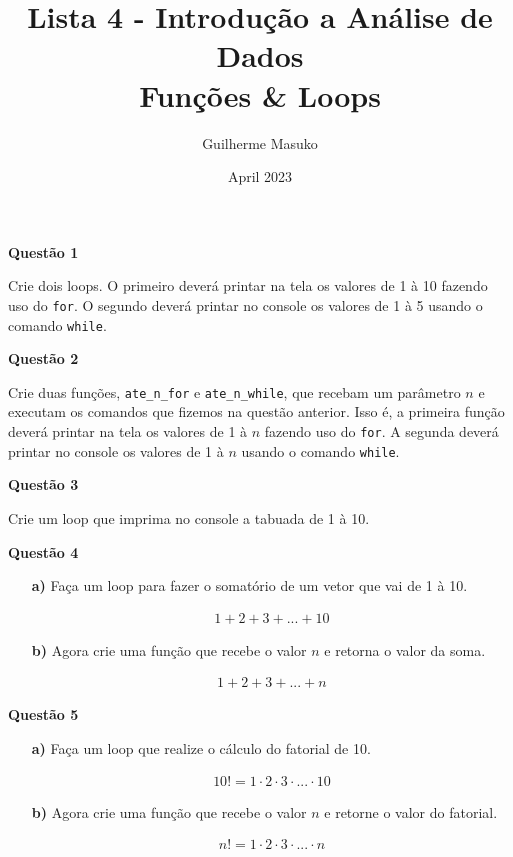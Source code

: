 \documentclass[12pt, a4paper]{article}
\title{Lista 4 - Introdução a Análise de Dados \\
	Funções \& Loops}
\author{Guilherme Masuko}
\date{April 2023}
\begin{document}
	
\clearpage
\maketitle
\thispagestyle{empty}

\textbf{Questão 1}

Crie dois loops. O primeiro deverá printar na tela os valores de 1 à 10 fazendo uso do \texttt{for}. O segundo deverá printar no console os valores de 1 à 5 usando o comando \texttt{while}.



\textbf{Questão 2}

Crie duas funções, \texttt{ate\_n\_for} e \texttt{ate\_n\_while}, que recebam um parâmetro $n$ e executam os comandos que fizemos na questão anterior. Isso é, a primeira função deverá printar na tela os valores de 1 à $n$ fazendo uso do \texttt{for}. A segunda deverá printar no console os valores de 1 à $n$ usando o comando \texttt{while}.



\textbf{Questão 3}

Crie um loop que imprima no console a tabuada de 1 à 10.



\textbf{Questão 4}

\begin{itemize}
	\item[\textbf{a)}] Faça um loop para fazer o somatório de um vetor que vai de 1 à 10.
	
		\begin{align*}
			1+ 2+ 3 + ... + 10
		\end{align*}
	\item[\textbf{b)}] Agora crie uma função que recebe o valor $n$ e retorna o valor da soma.
	
		\begin{align*}
			1+ 2+ 3 + ... + n
		\end{align*}
		
\end{itemize}



\textbf{Questão 5}

\begin{itemize}
	\item[\textbf{a)}] Faça um loop que realize o cálculo do fatorial de 10.
	
		\begin{align*}
			10! = 1\cdot 2\cdot 3 \cdot ... \cdot 10
		\end{align*}

	\item[\textbf{b)}] Agora crie uma função que recebe o valor $n$ e retorne o valor do fatorial.
	
		\begin{align*}
			n! = 1\cdot 2\cdot 3 \cdot ... \cdot n
		\end{align*}
\end{itemize}
\end{document}
